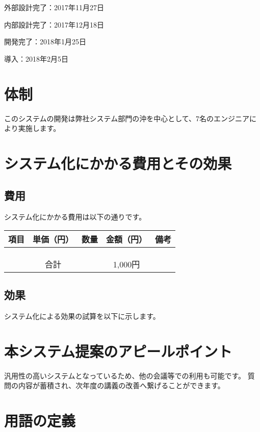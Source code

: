 \documentclass[a4j,titlepage]{ujarticle}
\begin{document}
外部設計完了：2017年11月27日

内部設計完了：2017年12月18日

開発完了：2018年1月25日

導入：2018年2月5日

\section{体制}
このシステムの開発は弊社システム部門の沖を中心として、7名のエンジニアにより実施します。

\section{システム化にかかる費用とその効果}
\subsection{費用}
システム化にかかる費用は以下の通りです。

\begin{table}[htb]
  \begin{tabular}{|c|c|c|c|c|} \hline
    項目 & 単価（円） & 数量 & 金額（円） & 備考 \\ \hline
     &  &  &  &  \\ \hline
     &  &  &  &  \\ \hline
     &  &  &  &  \\ \hline
    \multicolumn{3}{c||}{合計}& 1,000円 &  \\ \hline
  \end{tabular}
\end{table}


\subsection{効果}
システム化による効果の試算を以下に示します。

\section{本システム提案のアピールポイント}
汎用性の高いシステムとなっているため、他の会議等での利用も可能です。
質問の内容が蓄積され、次年度の講義の改善へ繋げることができます。

\section{用語の定義}
\newpage
\end{document}
